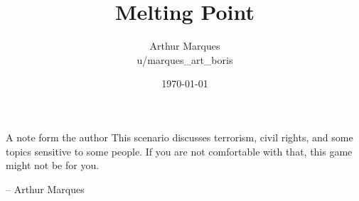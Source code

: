 \documentclass[10pt,twoside,twocolumn]{book}
\title{Melting Point}
\date{\today}
\author{Arthur Marques \\ u/marques\_art\_boris}
\begin{document}
\selectfont %
\frontmatter

\maketitle



\begin{rpg-warnbox}{A note form the author}
  This scenario discusses terrorism, civil rights, and some topics sensitive to some people. If you are not comfortable with that, this game might not be for you.

  \begin{flushright}
  -- Arthur Marques
  \end{flushright}
\end{rpg-warnbox}


\tableofcontents

\mainmatter






\end{document}
